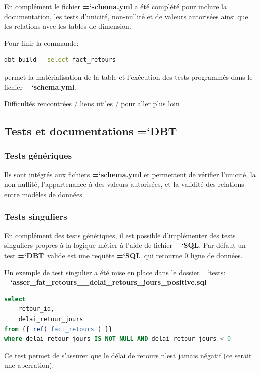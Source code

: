 \documentclass[11pt]{article}
\newcommand{\techno}[1]{{\ttfamily\bfseries\hyphenchar\font=`\-\color{Sienna}#1}}
\newcommand{\fichier}[1]{\colorbox{backcolor}{\ttfamily\bfseries\hyphenchar\font=`\-\color{filecolor}#1}}
\newcommand{\folder}[1]{\colorbox{backcolor}{\ttfamily\hyphenchar\font=`\-\color{FireBrick}#1}}
\newcommand{\dbt}{\techno{DBT}}
\newcommand{\sql}{\techno{SQL}}
\begin{document}
En complément le fichier \fichier{schema.yml} a été complété pour
inclure la documentation, les tests d'unicité, non-nullité et de valeurs autorisées ainsi que les relations avec les tables de dimension.

\noindent Pour finir la commande:
\begin{lstlisting}[language=bash]
dbt build --select fact_retours
\end{lstlisting}
permet la matérialisation de la table et l'exécution des tests programmés dans le fichier \fichier{schema.yml}.

\begin{flushright}
    \hyperref[ann:ajout_datamart_difficultes]{Difficultés rencontrées} /
    \hyperref[ann:ajout_datamart_liens_utiles]{liens utiles} / \hyperref[ann:ajout_datamart_aller_plus_loin]{pour aller plus loin}
\end{flushright}

\subsection{Tests et documentations \dbt}

\subsubsection{Tests génériques}

Ils sont intégrés aux fichiers \fichier{schema.yml} et permettent de vérifier l'unicité, la non-nullité, l'appartenance à des valeurs autorisées, et la validité des relations entre modèles de données.

\subsubsection{Tests singuliers}

En complément des tests génériques, il est possible d'implémenter des tests singuliers propres à la logique métier à l'aide de fichier \sql. Par défaut un test \dbt\ valide est une requête \sql\ qui retourne 0 ligne de données.

Un exemple de test singulier a été mise en place dans le dossier \folder{tests}: \\
\fichier{asser\_fat\_retours\_\_delai\_retours\_jours\_positive.sql}
\begin{lstlisting}[language=sql]
select
    retour_id,
    delai_retour_jours
from {{ ref('fact_retours') }}
where delai_retour_jours IS NOT NULL AND delai_retour_jours < 0
\end{lstlisting}
Ce test permet de s'assurer que le délai de retours n'est jamais
négatif (ce serait une aberration).
\end{document}
